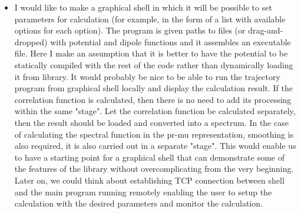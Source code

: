 \documentclass{article}
\begin{document}
\begin{itemize}
    \item I would like to make a graphical shell in which it will be possible to set parameters for calculation (for example, in the form of a list with available options for each option). The program is given paths to files (or drag-and-dropped) with potential and dipole functions and it assembles an executable file. Here I make an assumption that it is better to have the potential to be statically compiled with the rest of the code rather than dynamically loading it from library. It would probably be nice to be able to run the trajectory program from graphical shell locally and display the calculation result. If the correlation function is calculated, then there is no need to add its processing within the same "stage". Let the correlation function be calculated separately, then the result should be loaded and converted into a spectrum. In the case of calculating the spectral function in the pr-mu representation, smoothing is also required, it is also carried out in a separate "stage". This would enable us to have a starting point for a graphical shell that can demonstrate some of the features of the library without overcomplicating from the very beginning. Later on, we could think about establishing TCP connection between shell and the main program running remotely enabling the user to setup the calculation with the desired parameters and monitor the calculation. 
\end{itemize}
\end{document}
